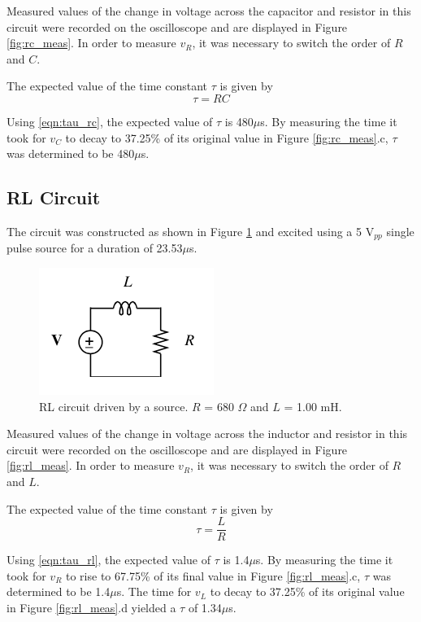 \documentclass[12pt]{article}
\begin{document}
Measured values of the change in voltage across the capacitor and resistor in this circuit were recorded on the oscilloscope and are displayed in Figure \ref{fig:rc_meas}. In order to measure $v_R$, it was necessary to switch the order of $R$ and $C$.

The expected value of the time constant $\tau$ is given by
\begin{equation}\label{eqn:tau_rc}
	\tau = RC
\end{equation}

Using \eqref{eqn:tau_rc}, the expected value of $\tau$ is 480$\mu$s. By measuring the time it took for $v_C$ to decay to 37.25\% of its original value in Figure \ref{fig:rc_meas}.c, $\tau$ was determined to be 480$\mu$s.

\subsection{RL Circuit}\label{sec:rl}
The circuit was constructed as shown in Figure \ref{fig:rl_circuit} and excited using a 5 V$_{pp}$ single pulse source for a duration of 23.53$\mu$s.

\begin{figure}[h]
	\centering
	\includegraphics[scale = 0.75]{rl_circuit}
	\caption{RL circuit driven by a source. $R$ = 680 $\Omega$ and $L$ = 1.00 mH. }
	\label{fig:rl_circuit}
\end{figure}

Measured values of the change in voltage across the inductor and resistor in this circuit were recorded on the oscilloscope and are displayed in Figure \ref{fig:rl_meas}. In order to measure $v_R$, it was necessary to switch the order of $R$ and $L$.

The expected value of the time constant $\tau$ is given by
\begin{equation}\label{eqn:tau_rl}
	\tau = \frac{L}{R}
\end{equation}

Using \eqref{eqn:tau_rl}, the expected value of $\tau$ is 1.4$\mu$s. By measuring the time it took for $v_R$ to rise to 67.75\% of its final value in Figure \ref{fig:rl_meas}.c, $\tau$ was determined to be 1.4$\mu$s. The time for $v_L$ to decay to 37.25\% of its original value in Figure \ref{fig:rl_meas}.d yielded a $\tau$ of 1.34$\mu$s.
\end{document}
